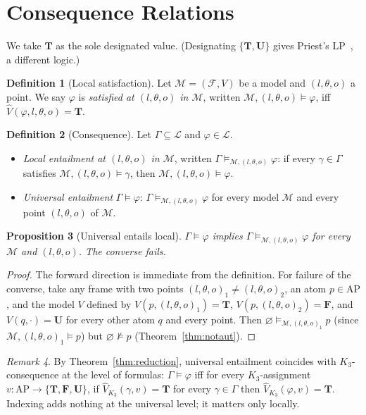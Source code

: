 \documentclass[11pt,a4paper]{article}
\theoremstyle{definition}
\newtheorem{definition}{Definition}
\theoremstyle{plain}
\newtheorem{proposition}[definition]{Proposition}
\theoremstyle{remark}
\newtheorem{remark}[definition]{Remark}
\newcommand{\Tv}{\mathbf{T}}
\newcommand{\Fv}{\mathbf{F}}
\newcommand{\Uv}{\mathbf{U}}
\newcommand{\Vals}{\{\Tv, \Fv, \Uv\}}
\newcommand{\Vh}{\widehat{V}}
\newcommand{\frm}{(l, \theta, o)}
\newcommand{\entails}{\vDash}
\newcommand{\Lang}{\mathcal{L}}
\newcommand{\AP}{\mathrm{AP}}
\newcommand{\Mod}{\mathcal{M}}
\newcommand{\Frame}{\mathcal{F}}
\begin{document}
\section{Consequence Relations}
\label{sec:consequence}

We take $\Tv$ as the sole designated value. (Designating $\{\Tv, \Uv\}$
gives Priest's LP~\cite{priest1979}, a different logic.)

\begin{definition}[Local satisfaction]
Let $\Mod = (\Frame, V)$ be a model and $\frm$ a point. We say
$\varphi$ is \emph{satisfied at $\frm$ in $\Mod$}, written
$\Mod, \frm \entails \varphi$, iff
$\Vh(\varphi, l, \theta, o) = \Tv$.
\end{definition}

\begin{definition}[Consequence]
Let $\Gamma \subseteq \Lang$ and $\varphi \in \Lang$.
\begin{itemize}
  \item \emph{Local entailment at $\frm$ in $\Mod$}, written
  $\Gamma \entails_{\Mod, \frm} \varphi$: if every $\gamma \in \Gamma$
  satisfies $\Mod, \frm \entails \gamma$, then $\Mod, \frm \entails \varphi$.
  \item \emph{Universal entailment} $\Gamma \entails \varphi$:
  $\Gamma \entails_{\Mod, \frm} \varphi$ for every model $\Mod$ and every
  point $\frm$ of $\Mod$.
\end{itemize}
\end{definition}

\begin{proposition}[Universal entails local]
$\Gamma \entails \varphi$ implies
$\Gamma \entails_{\Mod, \frm} \varphi$ for every $\Mod$ and $\frm$. The
converse fails.
\end{proposition}

\begin{proof}
The forward direction is immediate from the definition. For failure of
the converse, take any frame with two points $\frm_1 \neq \frm_2$, an atom
$p \in \AP$, and the model $V$ defined by $V(p, \frm_1) = \Tv$,
$V(p, \frm_2) = \Fv$, and $V(q, \cdot) = \Uv$ for every other atom $q$
and every point. Then $\varnothing \entails_{\Mod, \frm_1} p$ (since
$\Mod, \frm_1 \entails p$) but $\varnothing \not\entails p$
(Theorem~\ref{thm:notaut}).
\end{proof}

\begin{remark}
By Theorem~\ref{thm:reduction}, universal entailment coincides with
$K_3$-consequence at the level of formulas: $\Gamma \entails \varphi$ iff
for every $K_3$-assignment $v : \AP \to \Vals$, if $\Vh_{K_3}(\gamma, v)
= \Tv$ for every $\gamma \in \Gamma$ then $\Vh_{K_3}(\varphi, v) = \Tv$.
Indexing adds nothing at the universal level; it matters only locally.
\end{remark}
\end{document}
